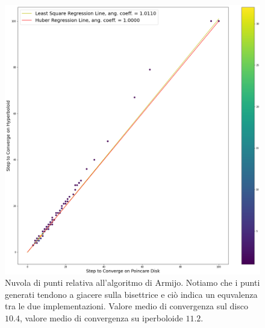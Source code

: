 \documentclass[a4paper, 12pt]{article}
\begin{document}
\begin{figure}[H] %
    \centering\includegraphics[width=1\textwidth]{armijo.png}
    \caption{Nuvola di punti relativa all'algoritmo di Armijo. Notiamo che i punti generati tendono a giacere sulla bisettrice e ciò indica un equvalenza tra le due implementazioni. Valore medio di convergenza sul disco $10.4$, valore medio di convergenza su iperboloide $11.2$.}
\end{figure}
\end{document}
